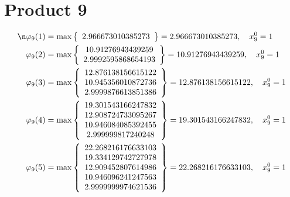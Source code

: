 \documentclass{article}
\begin{document}
\section{Product 9}
\begin{align*}
\n  
  
\varphi_{9}(1) &= \max \left\{ \begin{array}{c}
2.966673010385273
\end{array} \right\} = 2.966673010385273, \quad x_{9}^0 = 1\\
  
  
  
  
\varphi_{9}(2) &= \max \left\{ \begin{array}{c}
10.91276943439259 \\
 2.9992595868654193
\end{array} \right\} = 10.91276943439259, \quad x_{9}^0 = 1\\
  
  
  
  
\varphi_{9}(3) &= \max \left\{ \begin{array}{c}
12.876138156615122 \\
 10.945356010872736 \\
 2.9999876613851386
\end{array} \right\} = 12.876138156615122, \quad x_{9}^0 = 1\\
  
  
  
  
\varphi_{9}(4) &= \max \left\{ \begin{array}{c}
19.301543166247832 \\
 12.908724733095267 \\
 10.946084085392455 \\
 2.999999817240248
\end{array} \right\} = 19.301543166247832, \quad x_{9}^0 = 1\\
  
  
  
  
\varphi_{9}(5) &= \max \left\{ \begin{array}{c}
22.268216176633103 \\
 19.334129742727978 \\
 12.909452807614986 \\
 10.946096241247563 \\
 2.9999999974621536
\end{array} \right\} = 22.268216176633103, \quad x_{9}^0 = 1\\
  
  
  

\end{align*}
\end{document}
